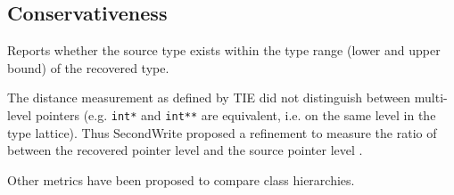 
\subsection{Conservativeness}

Reports whether the source type exists within the type range (lower and upper bound) of the recovered type.

The distance measurement as defined by TIE did not distinguish between multi-level pointers (e.g. \texttt{int*} and \texttt{int**} are equivalent, i.e. on the same level in the type lattice). Thus SecondWrite proposed a refinement to measure the ratio of between the recovered pointer level and the source pointer level \cite{second_write_scalable_type_detection}.

Other metrics have been proposed to compare class hierarchies.
